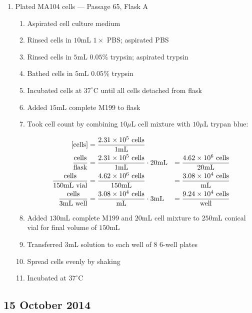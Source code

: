 \begin{enumerate}
	\item Plated MA104 cells --- Passage 65, Flask A
		\begin{enumerate}
			\item Aspirated cell culture medium
			\item Rinsed cells in $10$mL $1\times$ PBS; aspirated PBS
			\item Rinsed cells in $5$mL $0.05$\% trypsin; aspirated trypsin
			\item Bathed cells in $5$mL $0.05$\% trypsin
			\item Incubated cells at $37^{\circ}$C until all cells detached from flask
			\item Added $15$mL complete M199 to flask
			\item Took cell count by combining $10\mu$L cell mixture with $10\mu$L trypan blue:
			
				\begin{align*}
				\text{[cells]} &= \frac{2.31\times 10^{5}\text{ cells}}{1\text{mL}} \\
				\frac{\text{cells}}{\text{flask}} &= \frac{2.31\times 10^{5}\text{ cells}}{1\text{mL}} \cdot 20\text{mL} &= \frac{4.62\times 10^{6}\text{ cells}}{20\text{mL}}\\
				\frac{\text{cells}}{150\text{mL vial}} &= \frac{4.62\times 10^{6}\text{ cells}}{150\text{mL}} &= \frac{3.08\times 10^{4}\text{ cells}}{\text{mL}}\\
				\frac{\text{cells}}{3\text{mL well}} &= \frac{3.08\times 10^{4}\text{ cells}}{\text{mL}} \cdot 3\text{mL} &= \frac{9.24\times 10^{4}\text{ cells}}{\text{well}}\\
				\end{align*}
			\item Added $130$mL complete M199 and $20$mL cell mixture to $250$mL conical vial for final volume of $150$mL
			\item Transferred $3$mL solution to each well of 8 6-well plates
			\item Spread cells evenly by shaking
			\item Incubated at $37^{\circ}$C
		\end{enumerate}
\end{enumerate}

% 

\subsection*{15 October 2014}

